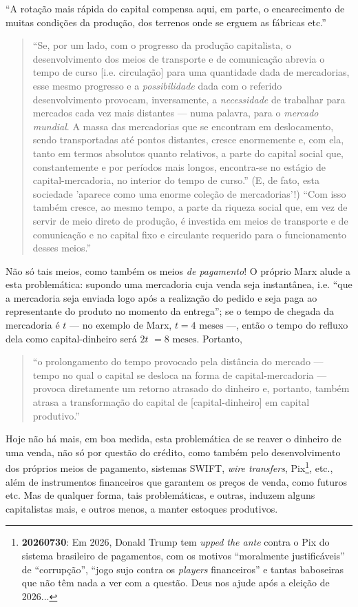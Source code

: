 ``A rotação mais rápida do capital compensa aqui, em parte, o encarecimento de muitas condições da produção, dos terrenos onde se erguem as fábricas etc.'' \parencite[p. 346]{Marx2014}

\begin{quote}
``Se, por um lado, com o progresso da produção capitalista, o desenvolvimento dos meios de transporte e de comunicação abrevia o tempo de curso [i.e. circulação] para uma quantidade dada de mercadorias, esse mesmo progresso e a \textit{possibilidade} dada com o referido desenvolvimento provocam, inversamente, a \textit{necessidade} de trabalhar para mercados cada vez mais distantes — numa palavra, para o \textit{mercado mundial}. A massa das mercadorias que se encontram em deslocamento, sendo transportadas até pontos distantes, cresce enormemente e, com ela, tanto em termos absolutos quanto relativos, a parte do capital social que, constantemente e por períodos mais longos, encontra-se no estágio de capital-mercadoria, no interior do tempo de curso.'' (E, de fato, esta sociedade 'aparece como uma enorme coleção de mercadorias'!) ``Com isso também cresce, ao mesmo tempo, a parte da riqueza social que, em vez de servir de meio direto de produção, é investida em meios de transporte e de comunicação e no capital fixo e circulante requerido para o funcionamento desses meios.'' \parencite[p. 346, grifo meu]{Marx2014}
\end{quote}

Não só tais meios, como também os meios \textit{de pagamento}! O próprio Marx alude a esta problemática: supondo uma mercadoria cuja venda seja instantânea, i.e. ``que a mercadoria seja enviada logo após a realização do pedido e seja paga ao representante do produto no momento da entrega''; se o tempo de chegada da mercadoria é $t$ — no exemplo de Marx, $t=4 \text{ meses}$ —, então o tempo do refluxo dela como capital-dinheiro será $2t$ $=8\text{ meses}$. Portanto,
\begin{quote}
``o prolongamento do tempo provocado pela distância do mercado — tempo no qual o capital se desloca na forma de capital-mercadoria — provoca diretamente um retorno atrasado do dinheiro e, portanto, também atrasa a transformação do capital de [capital-dinheiro] em capital produtivo.'' \parencite[p. 349]{Marx2014}
\end{quote}

Hoje não há mais, em boa medida, esta problemática de se reaver o dinheiro de uma venda, não só por questão do crédito, como também pelo desenvolvimento dos próprios meios de pagamento, sistemas SWIFT, \textit{wire transfers}, Pix\footnote{\textbf{20260730}: Em 2026, Donald Trump tem \textit{upped the ante} contra o Pix do sistema brasileiro de pagamentos, com os motivos ``moralmente justificáveis'' de ``corrupção'', ``jogo sujo contra os \textit{players} financeiros'' e tantas baboseiras que não têm nada a ver com a questão. Deus nos ajude após a eleição de 2026... }, etc., além de instrumentos financeiros que garantem os preços de venda, como futuros etc. Mas de qualquer forma, tais problemáticas, e outras, induzem alguns capitalistas mais, e outros menos, a manter estoques produtivos.

